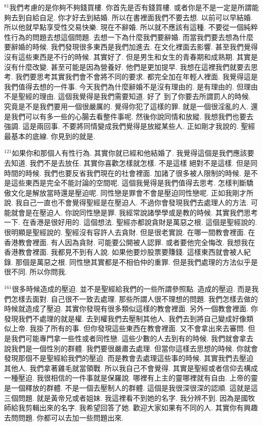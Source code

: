 \documentclass{book}
\begin{document}
$^{81}$我們考慮的是你夠不夠錢買樓.
你首先是否有錢買樓.
或者你是不是一定是所謂能夠去到自給自足.
你才好去到結婚.
所以在書裡面我們不要去想.
以前可以早結婚.
所以他就早點享受性交易快樂.
現在不辭婚.
所以就不應該有這種.
不要從一個純粹性行為的問題去想這個問題.
去想一下為什麼我們要辭婚.
而當我們要去想為什麼要辭婚的時候.
我們發現很多東西是我們加進去.
在文化裡面去影響.
甚至我們覺得沒有這些東西是不行的時候.
其實好了.
但是男生和女生的青春期和成熟期.
其實是沒有什麼改變.
甚至可能是因為營養好.
他們是更加提早.
我想在這裡我們就要去思考.
我們要思考其實我們會不會將不同的要求.
都完全加在年輕人裡面.
我覺得這是我們值得去想的一件事.
今天我們為什麼辭婚不是沒有理由的.
是有理由的.
但理由不是聖經的理由.
這個我覺得是我們需要知道.
好了 到了你要去所謂罰人的時候.
究竟是不是我們要用一個很嚴厲的.
覺得你犯了這樣的罪.
就是一個很淫亂的人.
還是我們可以有多一些的心腸去看整件事呢.
然後你說同情和放縱.
我想我們也要去強調.
這是兩回事.
不要將同情變成我們覺得是放縱某些人.
正如剛才我說的.
聖經最基本的底線.
你見到的就是.

$^{121}$如果你和那個人有性行為.
其實你就已經和他結婚了.
我覺得這個是我們應該要去知道.
我們不是去放任.
其實你喜歡怎樣就怎樣.
不是這樣 絕對不是這樣.
但是同時間的時候.
我們也要反省我們現在的社會裡面.
加諸了很多被人限制的時候.
是不是這些東西是完全不能討論的空間呢.
這個我覺得是我們值得去思考.
怎樣判斷驕傲文化是解放當時還是壓迫呢.
同性戀是罪會不會是壓迫同性戀呢.
正如我剛才所說.
我自己一直也不會覺得聖經是在壓迫人.
不過你會發現我們去處理人的方法.
可能就會是在壓迫人.
你說同性戀是罪.
我經常說諸學學或是教的時候.
其實我們思考一下.
在香港是很好用的.
這個想法.
聖經亦都說貪財是萬惡之根.
這個是聖經說的.
很明顯是聖經說的.
聖經沒有容許人去貪財.
但是很老實說.
在哪一間教會裡面.
在香港教會裡面.
有人因為貪財.
可能要公開被人認罪.
或者要他完全悔改.
我想我在香港教會裡面.
我都見不到有人說.
如果他要炒股票要賺錢.
這樣東西就會被人紀錄.
那個是萬惡之根.
同性戀其實都是不相伯仲的重罪.
但是我們處理的方法似乎是很不同.
所以你問我.

$^{161}$很多時候造成的壓迫.
並不是聖經給我們的一些所謂參照點.
造成的壓迫.
而是我們怎樣去面對.
自己很不一致去處理.
那些所謂人很不理想的問題.
我們怎樣去做的時候就造成了壓迫.
其實你發現有很多類似這樣的教會裡面.
另外一個教會裡面.
你發現我們不處理的就是權.
去到權我們去壓制其他人.
我們去到將自己變成好像類似上帝.
我掛了所有的事.
但你發現這些東西在教會裡面.
又不會拿出來去審問.
但是我們可能專門拿一些性或者同性戀.
這些少數的人去到有的時候.
我們就會拿去說我們是一個性別的群體.
我們要很嚴肅去處理.
但當你這樣去思想的時候.
你就會發現那個不是聖經給我們的壓迫.
而是教會去處理這些事的時候.
其實我們去壓迫其他人.
我們拿著雞毛就當領戰.
所以我自己不會覺得.
其實是聖經或者信仰去構成一種壓迫.
我很相信的一件事就是保羅說.
哪裡有上主的靈哪裡就有自由.
上帝的靈是一個釋放的群體.
不是一個去壓制人的群體.
這個是我很深很深的認順.
這就是這三個問題.
就是黃帝兄或者姐妹.
我這裡看不到她的名字.
我分辨不到.
因為是國牧師給我剪輯出來的名字.
我希望回答了她.
歡迎大家如果有不同的人.
其實你有興趣去問問題.
你都可以去加一些問題出來.
\end{document}
